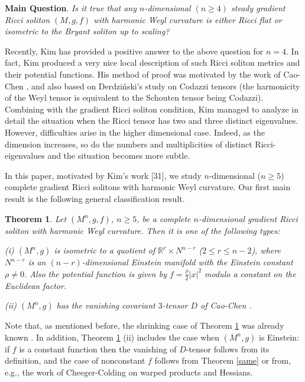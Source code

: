 \documentclass{amsart}
\newtheorem{theorem}{Theorem}[section]
\theoremstyle{definition}
\theoremstyle{remark}
\numberwithin{equation}{section}
\begin{document}
\medskip
\noindent \textbf{Main Question}.
\emph{Is it true that any $n$-dimensional $(n\geq 4)$ steady gradient Ricci soliton $(M, g, f)$ with harmonic Weyl curvature is either Ricci flat or isometric to the Bryant soliton up to scaling?}

\medskip
Recently, Kim \cite{Kim} has provided a positive answer to the above question for $n=4$. 
In fact, Kim produced a very nice local description of such Ricci soliton metrics and their potential functions. His method of proof was motivated by the work of Cao-Chen \cite{CC1, CC2}, and also based on Derdzi\'{n}ski's study on Codazzi tensors \cite{De} (the harmonicity of the Weyl tensor is equivalent to the Schouten tensor being Codazzi).  
Combining with the gradient Ricci soliton condition, Kim managed to analyze in detail the situation when the Ricci tensor has two and three distinct eigenvalues. However, difficulties arise in the higher dimensional case. Indeed, as the dimension increases, so do the numbers and multiplicities of distinct Ricci-eigenvalues and the situation becomes more subtle.

In this paper, motivated by Kim's work [31], we study $n$-dimensional ($n\geq 5$) complete gradient Ricci solitons with harmonic Weyl curvature. Our first main result is the following general classification result. 

\begin{theorem} \label{complete}
	Let $(M^n, g, f)$, $n\geq 5$,  be a complete $n$-dimensional gradient Ricci soliton with harmonic Weyl curvature. Then it is one of the following types:
		
	\smallskip	
	{\rm (i)} 
	$(M^n, g)$ is isometric to a quotient of $\mathbb{R}^{r}\times N^{n-r}$ ($2\leq r\leq n-2$), where $N^{n-r}$ is an $(n-r)$-dimensional Einstein manifold with the Einstein constant $\rho\neq 0$.
	Also the potential function is given by $f = \frac{\rho}{2} |x|^2$ modulo a constant on the Euclidean factor.  
	
	\smallskip	
	{\rm (ii)} $(M^n, g)$ has the vanishing covariant $3$-tensor $D$ of Cao-Chen \cite{CC1, CC2}. 
\end{theorem}

Note that, as mentioned before, the shrinking case of Theorem \ref{complete} was already known \cite{FG, MS}. In addition, Theorem \ref{complete} (ii) includes the case when $(M^n, g)$ is Einstein: if $f$ is a constant function then the vanishing of $D$-tensor follows from its definition, and the case of nonconstant $f$ follows from Theorem \ref{same} or from, e.g., the work of Cheeger-Colding \cite{CC} on warped products and Hessians.
\end{document}
